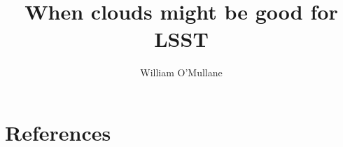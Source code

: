 \documentclass[DM,TN,lsstdraft]{lsstdoc}
\title{When  clouds might be good  for LSST}
\author{%
William O'Mullane
}
\date{\vcsDate}
\begin{document}
\mkshorttitle


\appendix
\section{References} \label{sec:bib}


%
\printglossaries
\end{document}
